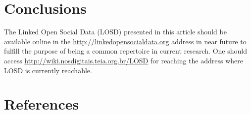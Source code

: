 \documentclass[review]{elsarticle}
\begin{document}
\section{Conclusions}
\label{conclusions}
The Linked Open Social Data (LOSD) presented in this article
should be available online in the \url{http://linkedopensocialdata.org}
address in near future to fulfill the purpose of being a common
repertoire in current research.
One should access \url{http://wiki.nosdigitais.teia.org.br/LOSD}
for reaching the address where LOSD is currently reachable.

\section*{References}
%

%
%
\end{document}
